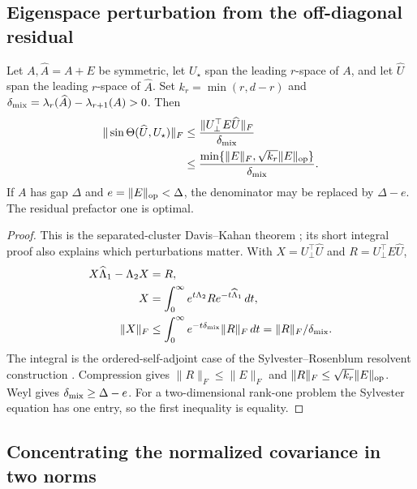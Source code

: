 \subsection{Eigenspace perturbation from the off-diagonal residual}
\label{app:sharp-spectral-tools}

\begin{lemma}
\label{lem:sharp-Davis-Kahan}
Let $A,\widehat A=A+E$ be symmetric, let $U_\star$ span the leading
$r$-space of $A$, and let $\widehat U$ span the leading $r$-space of
$\widehat A$. Set $k_r=\min(r,d-r)$ and
$\delta_{\rm mix}=\lambda_r(\widehat A)-\lambda_{r+1}(A)>0$. Then
\begin{align}
 \|\sin\Theta(\widehat U,U_\star)\|_F
 &\le\frac{\|U_\perp^\top E\widehat U\|_F}{\delta_{\rm mix}}\\
 &\le\frac{\min\{\|E\|_F,\sqrt{k_r}\|E\|_{\rm op}\}}
                {\delta_{\rm mix}}.
 \label{eq:sharp-Davis-Kahan}
\end{align}
If $A$ has gap $\Delta$ and $e=\|E\|_{\rm op}<\Delta$, the denominator
may be replaced by $\Delta-e$. The residual prefactor one is optimal.
\end{lemma}
\begin{proof}
This is the separated-cluster Davis--Kahan theorem
\cite{davis1970rotation,yu2015useful}; its short integral proof also explains
which perturbations matter. With $X=U_\perp^\top\widehat U$ and
$R=U_\perp^\top E\widehat U$,
\begin{align}
 X\widehat\Lambda_1-\Lambda_2X&=R,\\
 X&=\int_0^\infty e^{t\Lambda_2}R e^{-t\widehat\Lambda_1}\,dt,\\
 \|X\|_F&\le\int_0^\infty e^{-t\delta_{\rm mix}}\|R\|_F\,dt
              =\|R\|_F/\delta_{\rm mix}.
\end{align}
The integral is the ordered-self-adjoint case of the
Sylvester--Rosenblum resolvent construction \cite{bhatia1997operator}.
Compression gives $\|R\|_F\le\|E\|_F$ and
$\|R\|_F\le\sqrt{k_r}\|E\|_{\rm op}$. Weyl gives
$\delta_{\rm mix}\ge\Delta-e$. For a two-dimensional rank-one problem
the Sylvester equation has one entry, so the first inequality is equality.
\end{proof}

\subsection{Concentrating the normalized covariance in two norms}
\label{app:sharp-concentration}

